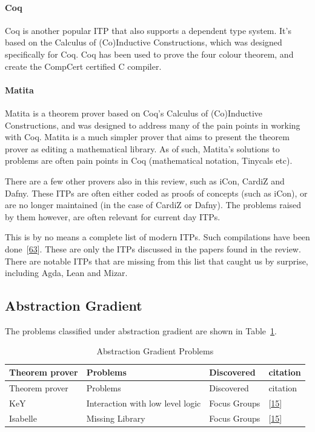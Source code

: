 \documentclass[
]{article}
\begin{document}
\hypertarget{coq}{%
\paragraph{Coq}\label{coq}}

Coq is another popular ITP that also supports a dependent type system.
It's based on the Calculus of (Co)Inductive Constructions, which was
designed specifically for Coq. Coq has been used to prove the four
colour theorem, and create the CompCert certified C compiler.

\hypertarget{matita}{%
\paragraph{Matita}\label{matita}}

Matita is a theorem prover based on Coq's Calculus of (Co)Inductive
Constructions, and was designed to address many of the pain points in
working with Coq. Matita is a much simpler prover that aims to present
the theorem prover as editing a mathematical library. As of such,
Matita's solutions to problems are often pain points in Coq
(mathematical notation, Tinycals etc).

There are a few other provers also in this review, such as iCon, CardiZ
and Dafny. These ITPs are often either coded as proofs of concepts (such
as iCon), or are no longer maintained (in the case of CardiZ or Dafny).
The problems raised by them however, are often relevant for current day
ITPs.

This is by no means a complete list of modern ITPs. Such compilations
have been done~{[}\protect\hyperlink{ref-nawaz_survey_2019}{63}{]}.
These are only the ITPs discussed in the papers found in the review.
There are notable ITPs that are missing from this list that caught us by
surprise, including Agda, Lean and Mizar.

\hypertarget{abstraction-gradient}{%
\subsection{Abstraction Gradient}\label{abstraction-gradient}}

The problems classified under abstraction gradient are shown in
Table~\ref{tbl:abstraction_gradient}.

\hypertarget{tbl:abstraction_gradient}{}
\begin{longtable}[]{@{}llll@{}}
\caption{\label{tbl:abstraction_gradient}Abstraction Gradient
Problems}\tabularnewline
\toprule
Theorem prover & Problems & Discovered & citation \\
\midrule
\endfirsthead
\toprule
Theorem prover & Problems & Discovered & citation \\
\midrule
\endhead
KeY & Interaction with low level logic & Focus Groups &
{[}\protect\hyperlink{ref-beckert_usability_2015}{15}{]} \\
Isabelle & Missing Library & Focus Groups &
{[}\protect\hyperlink{ref-beckert_usability_2015}{15}{]} \\
\bottomrule
\end{longtable}
\end{document}
